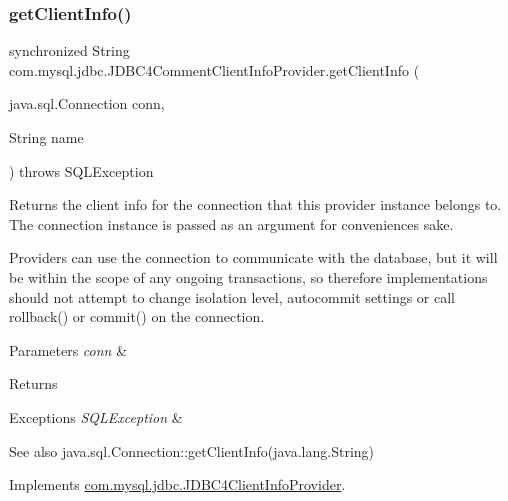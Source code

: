 \subsubsection{\texorpdfstring{get\+Client\+Info()}{getClientInfo()}\hspace{0.1cm}{\footnotesize\ttfamily [2/2]}}
{\footnotesize\ttfamily synchronized String com.\+mysql.\+jdbc.\+J\+D\+B\+C4\+Comment\+Client\+Info\+Provider.\+get\+Client\+Info (\begin{DoxyParamCaption}\item[{java.\+sql.\+Connection}]{conn,  }\item[{String}]{name }\end{DoxyParamCaption}) throws S\+Q\+L\+Exception}

Returns the client info for the connection that this provider instance belongs to. The connection instance is passed as an argument for convenience\textquotesingle{}s sake.

Providers can use the connection to communicate with the database, but it will be within the scope of any ongoing transactions, so therefore implementations should not attempt to change isolation level, autocommit settings or call rollback() or commit() on the connection.


\begin{DoxyParams}{Parameters}
{\em conn} & \\
\hline
\end{DoxyParams}
\begin{DoxyReturn}{Returns}

\end{DoxyReturn}

\begin{DoxyExceptions}{Exceptions}
{\em S\+Q\+L\+Exception} & \\
\hline
\end{DoxyExceptions}
\begin{DoxySeeAlso}{See also}
java.\+sql.\+Connection\+::get\+Client\+Info(java.\+lang.\+String) 
\end{DoxySeeAlso}


Implements \mbox{\hyperlink{interfacecom_1_1mysql_1_1jdbc_1_1_j_d_b_c4_client_info_provider_ab96958315c2fc129db072cfca9bd9547}{com.\+mysql.\+jdbc.\+J\+D\+B\+C4\+Client\+Info\+Provider}}.

\mbox{\label{classcom_1_1mysql_1_1jdbc_1_1_j_d_b_c4_comment_client_info_provider_a4bac1954180325c5961e2e5270be7ced}} 
